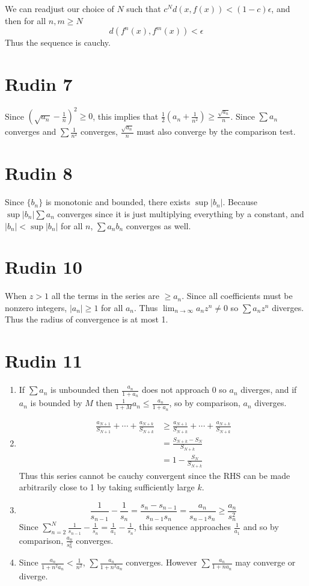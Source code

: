 \documentclass{article}
\begin{document}
We can readjust our choice of $N$ such that $c^{N}d(x, f(x)) < (1-c)\epsilon$,
and then for all $n,m \geq N$
\[
	d(f^n(x), f^{m}(x)) < \epsilon
\]
Thus the sequence is cauchy.
\newpage 

\section*{Rudin 7}
Since $(\sqrt{a_n}-\frac{1}{n})^2 \geq 0$,
this implies that $\frac{1}{2}(a_n + \frac{1}{n^2}) \geq \frac{\sqrt{a_n}}{n}$.
Since $\sum a_n$ converges and $\sum \frac{1}{n^2}$ converges,
$\frac{\sqrt{a_n}}{n}$ must also converge by the comparison test.
\newpage 

\section*{Rudin 8}
Since $\{b_n\}$ is monotonic and bounded, there exists $\sup |b_n|$.
Because $\sup |b_n| \sum a_n$ converges since it is just multiplying everything by a constant,
and $|b_n| < \sup |b_n|$ for all $n$,
$\sum a_n b_n$ converges as well.
\newpage 

\section*{Rudin 10}
When $z>1$ all the terms in the series are $\geq a_n$.
Since all coefficients must be nonzero integers, $|a_n| \geq 1$ for all $a_n$.
Thus $\lim_{n \to \infty} a_nz^n \neq 0$ so $\sum a_nz^n$ diverges.
Thus the radius of convergence is at most 1.
\newpage 

\section*{Rudin 11}
\begin{enumerate}
	\item If $\sum a_n$ is unbounded then $\frac{a_n}{1+a_n}$ does not approach $0$ so $a_n$ diverges,
	and if $a_n$ is bounded by $M$ then $\frac{1}{1+M}a_n \leq \frac{a_n}{1+a_n}$,
	so by comparison, $a_n$ diverges.
	\item \begin{align*}
		\frac{a_{N+1}}{S_{N+1}} + \cdots + \frac{a_{N+k}}{S_{N+k}} 
		&\geq \frac{a_{N+1}}{S_{N+k}} + \cdots + \frac{a_{N+k}}{S_{N+k}} \\
		&= \frac{S_{N+k} - S_{N}}{S_{N+k}} \\
		&= 1 - \frac{S_{N}}{S_{N+k}}
	\end{align*}
	Thus this series cannot be cauchy convergent since the RHS
	can be made arbitrarily close to 1 by taking sufficiently large $k$.
	\item 
	\[
		\frac{1}{s_{n-1}} - \frac{1}{s_{n}} = \frac{s_n - s_{n-1}}{s_{n-1}s_n} = \frac{a_n}{s_{n-1}s_n} \geq \frac{a_n}{s_n^2}
	\]
	Since $\sum_{n=2}^N \frac{1}{s_{n-1}} - \frac{1}{s_{n}} = \frac{1}{a_1}- \frac{1}{s_n}$,
	this sequence approaches $\frac{1}{a_1}$ and so by comparison, $\frac{a_n}{s_n^2}$ converges.
	\item Since $\frac{a_n}{1+n^2a_n} < \frac{1}{n^2}$, $\sum \frac{a_n}{1+n^2a_n}$ converges.
	However $\sum \frac{a_n}{1+na_n}$ may converge or diverge.
	
\end{enumerate}
\end{document}
